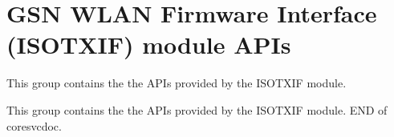 \hypertarget{a00626}{
\section{GSN WLAN Firmware Interface (ISOTXIF) module APIs}
\label{a00626}
}


This group contains the the APIs provided by the ISOTXIF module.  


This group contains the the APIs provided by the ISOTXIF module. END of coresvcdoc. 